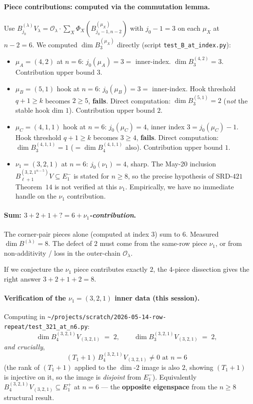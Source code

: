 \documentclass[11pt]{article}
\theoremstyle{definition}
\begin{document}
\paragraph{Piece contributions: computed via the commutation lemma.}
Use $B^{(\lambda)}_{j_0} V_\lambda = \mathcal{O}_\lambda \cdot \sum_X
\Phi_X(B^{(\mu_X)}_{j_0 - 1, n - 2})$ with $j_0 - 1 = 3$ on each
$\mu_X$ at $n - 2 = 6$.  We computed $\dim B^{(\mu_X)}_3$ directly
(script \texttt{test\_B\_at\_index.py}):
\begin{itemize}[topsep=0.3em,itemsep=0.2em]
\item $\mu_A = (4, 2)$ at $n = 6$: $j_0(\mu_A) = 3 = $ inner-index.
$\dim B^{(4, 2)}_3 = 3$.  Contribution upper bound $3$.
\item $\mu_B = (5, 1)$ hook at $n = 6$: $j_0(\mu_B) = 3 = $
inner-index.  Hook threshold $q + 1 \ge k$ becomes $2 \ge 5$,
\textbf{fails}.  Direct computation: $\dim B^{(5, 1)}_3 = 2$
(\emph{not} the stable hook dim $1$).  Contribution upper bound $2$.
\item $\mu_C = (4, 1, 1)$ hook at $n = 6$: $j_0(\mu_C) = 4$, inner
index $3 = j_0(\mu_C) - 1$.  Hook threshold $q + 1 \ge k$ becomes
$3 \ge 4$, \textbf{fails}.  Direct computation: $\dim B^{(4, 1, 1)}_3
= 1$ ($= \dim B^{(4, 1, 1)}_4$ also).  Contribution upper bound $1$.
\item $\nu_1 = (3, 2, 1)$ at $n = 6$: $j_0(\nu_1) = 4$, sharp.
The May-20 inclusion $B^{(3, 2, 1^{n-5})}_{\ell + 1} V \subseteq E_1^-$
is stated for $n \ge 8$, so the precise hypothesis of SRD-$421$
Theorem~$14$ is not verified at this $\nu_1$.  Empirically, we have
no immediate handle on the $\nu_1$ contribution.
\end{itemize}

\paragraph{Sum: $3 + 2 + 1 + ? = 6 + \nu_1$\textit{-contribution}.}
The corner-pair pieces alone (computed at index $3$) sum to $6$.
Measured $\dim B^{(\lambda)} = 8$.  The defect of $2$ must come from
the same-row piece $\nu_1$, or from non-additivity / loss in the
outer-chain $\mathcal{O}_\lambda$.

If we conjecture the $\nu_1$ piece contributes exactly $2$, the
4-piece dissection gives the right answer $3 + 2 + 1 + 2 = 8$.

\paragraph{Verification of the $\nu_1 = (3, 2, 1)$ inner data
(this session).}
Computing in
\texttt{\textasciitilde/projects/scratch/2026-05-14-row-repeat/test\_321\_at\_n6.py}:
\[
   \dim B^{(3, 2, 1)}_4 V_{(3, 2, 1)} \;=\; 2,
   \qquad \dim B^{(3, 2, 1)}_3 V_{(3, 2, 1)} \;=\; 2,
\]
\emph{and crucially},
\[
   \boxed{\;(T_1 + 1)\, B^{(3, 2, 1)}_4 V_{(3, 2, 1)} \ne 0
   \text{ at } n = 6\;}
\]
(the rank of $(T_1{+}1)$ applied to the $\dim$-$2$ image is also $2$,
showing $(T_1{+}1)$ is injective on it, so the image is \emph{disjoint}
from $E_1^-$).  Equivalently $B^{(3, 2, 1)}_4 V_{(3, 2, 1)} \subseteq
E_1^+$ at $n = 6$ --- the \textbf{opposite eigenspace} from the
$n \ge 8$ structural result.
\end{document}
